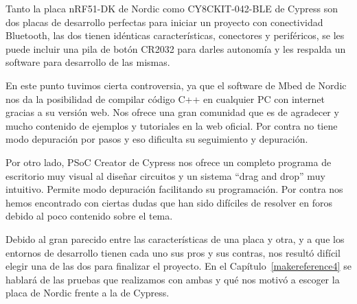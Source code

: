 Tanto la placa nRF51-DK de Nordic como CY8CKIT-042-BLE de Cypress son dos placas de desarrollo perfectas para iniciar un proyecto con conectividad Bluetooth, las dos tienen idénticas características, conectores y periféricos, se les puede incluir una pila de botón CR2032 para darles autonomía y les respalda un software para desarrollo de las mismas.

En este punto tuvimos cierta controversia, ya que el software de Mbed de Nordic nos da la posibilidad de compilar código C++ en cualquier PC con internet gracias a su versión web. Nos ofrece una gran comunidad que es de agradecer y mucho contenido de ejemplos y tutoriales en la web oficial. Por contra no tiene modo depuración por pasos y eso dificulta su seguimiento y depuración. 

Por otro lado, PSoC Creator de Cypress nos ofrece un completo programa de escritorio muy visual al diseñar circuitos y un sistema “drag and drop” muy intuitivo. Permite modo depuración facilitando su programación. Por contra nos hemos encontrado con ciertas dudas que han sido difíciles de resolver en foros debido al poco contenido sobre el tema.

Debido al gran parecido entre las características de una placa y otra, y a que los entornos de desarrollo tienen cada uno sus pros y sus contras, nos resultó difícil elegir una de las dos para finalizar el proyecto. En el Capítulo~\ref{makereference4} se hablará de las pruebas que realizamos con ambas y qué nos motivó a escoger la placa de Nordic frente a la de Cypress.